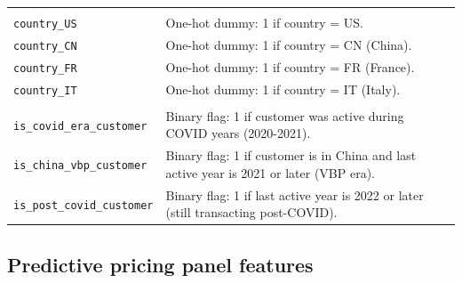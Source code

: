 \documentclass{article}
\begin{document}
\begin{longtable}{@{}p{5.4cm} p{10.6cm}@{}}
\rowcolor{gray!20} \multicolumn{2}{@{}l}{\textit{Country dummies}} \\
\texttt{country\_\allowbreak US} & One-hot dummy: 1 if country = US. \\
\texttt{country\_\allowbreak CN} & One-hot dummy: 1 if country = CN (China). \\
\texttt{country\_\allowbreak FR} & One-hot dummy: 1 if country = FR (France). \\
\texttt{country\_\allowbreak IT} & One-hot dummy: 1 if country = IT (Italy). \\

\rowcolor{gray!20} \multicolumn{2}{@{}l}{\textit{Structural flags}} \\
\texttt{is\_\allowbreak covid\_\allowbreak era\_\allowbreak customer} & Binary flag: 1 if customer was active during COVID years (2020-2021). \\
\texttt{is\_\allowbreak china\_\allowbreak vbp\_\allowbreak customer} & Binary flag: 1 if customer is in China and last active year is 2021 or later (VBP era). \\
\texttt{is\_\allowbreak post\_\allowbreak covid\_\allowbreak customer} & Binary flag: 1 if last active year is 2022 or later (still transacting post-COVID). \\
\end{longtable}

\subsection{Predictive pricing panel features}
\end{document}
